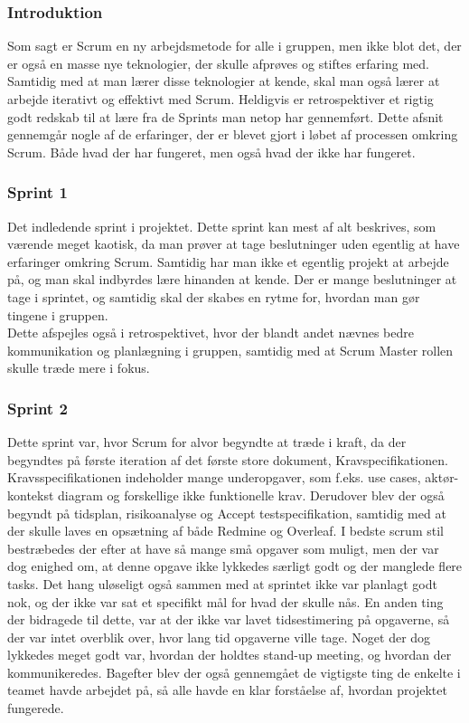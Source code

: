 \documentclass[a4paper,12pt,fleqn,oneside]{article}
\begin{document}
\subsubsection{Introduktion}
Som sagt er Scrum en ny arbejdsmetode for alle i gruppen, men ikke blot det, der er også en masse nye teknologier, der skulle afprøves og stiftes erfaring med. Samtidig med at man lærer disse teknologier at kende, skal man også lærer at arbejde iterativt og effektivt med Scrum. Heldigvis er retrospektiver et rigtig godt redskab til at lære fra de Sprints man netop har gennemført. Dette afsnit gennemgår nogle af de erfaringer, der er blevet gjort i løbet af processen omkring Scrum. Både hvad der har fungeret, men også hvad der ikke har fungeret.

\subsubsection{Sprint 1}
Det indledende sprint i projektet. Dette sprint kan mest af alt beskrives, som værende meget kaotisk, da man prøver at tage beslutninger uden egentlig at have erfaringer omkring Scrum. Samtidig har man ikke et egentlig projekt at arbejde på, og man skal indbyrdes lære hinanden at kende. Der er mange beslutninger at tage i sprintet, og samtidig skal der skabes en rytme for, hvordan man gør tingene i gruppen. 
\\Dette afspejles også i retrospektivet, hvor der blandt andet nævnes bedre kommunikation og planlægning i gruppen, samtidig med at Scrum Master rollen skulle træde mere i fokus. 

\subsubsection{Sprint 2}
Dette sprint var, hvor Scrum for alvor begyndte at træde i kraft, da der begyndtes på første iteration af det første store dokument, Kravspecifikationen. Kravsspecifikationen indeholder mange underopgaver, som f.eks. use cases, aktør-kontekst diagram og forskellige ikke funktionelle krav. Derudover blev der også begyndt på tidsplan, risikoanalyse og Accept testspecifikation, samtidig med at der skulle laves en opsætning af både Redmine og Overleaf. I bedste scrum stil bestræbedes der efter at have så mange små opgaver som muligt, men der var dog enighed om, at denne opgave ikke lykkedes særligt godt og der manglede flere tasks. Det hang uløseligt også sammen med at sprintet ikke var planlagt godt nok, og der ikke var sat et specifikt mål for hvad der skulle nås. En anden ting der bidragede til dette, var at der ikke var lavet tidsestimering på opgaverne, så der var intet overblik over, hvor lang tid opgaverne ville tage. Noget der dog lykkedes meget godt var, hvordan der holdtes stand-up meeting, og hvordan der kommunikeredes. Bagefter blev der også gennemgået de vigtigste ting de enkelte i teamet havde arbejdet på, så alle havde en klar forståelse af, hvordan projektet fungerede. 
\end{document}
